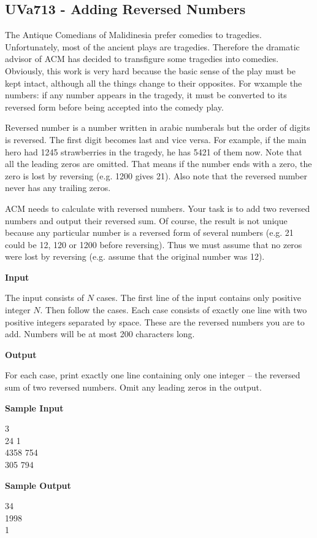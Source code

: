 \subsection{UVa713 - Adding Reversed Numbers}
The Antique Comedians of Malidinesia prefer comedies to tragedies. Unfortunately, most of the ancient plays are tragedies. Therefore the dramatic advisor of ACM has decided to transfigure some tragedies into comedies. Obviously, this work is very hard because the basic sense of the play must be kept intact, although all the things change to their opposites. For wxample the numbers: if any number appears in the tragedy, it must be converted to its reversed form before being accepted into the comedy play.

Reversed number is a number written in arabic numberals but the order of digits is reversed. The first digit becomes last and vice versa. For example, if the main hero had 1245 strawberries in the tragedy, he has 5421 of them now. Note that all the leading zeros are omitted. That means if the number ends with a zero, the zero is lost by reversing (e.g. 1200 gives 21). Also note that the reversed number never has any trailing zeros.

ACM needs to calculate with reversed numbers. Your task is to add two reversed numbers and output their reversed sum. Of course, the result is not unique because any particular number is a reversed form of several numbers (e.g. 21 could be 12, 120 or 1200 before reversing). Thus we must assume that no zeros were lost by reversing (e.g. assume that the original number was 12).

\begin{flushleft}
{\color{red} \textbf{Input}}
\end{flushleft}
The input consists of $N$ cases. The first line of the input contains only positive integer $N$. Then follow the cases. Each case consists of exactly one line with two positive integers separated by space. These are the reversed numbers you are to add. Numbers will be at most 200 characters long.

\begin{flushleft}
{\color{red} \textbf{Output}}
\end{flushleft}
For each case, print exactly one line containing only one integer -- the reversed sum of two reversed numbers. Omit any leading zeros in the output.

\begin{flushleft}
{\color{red} \textbf{Sample Input}}
\end{flushleft}
\begin{flushleft}
3\\
24 1\\
4358 754\\
305 794\\
\end{flushleft}

\begin{flushleft}
{\color{red} \textbf{Sample Output}}
\end{flushleft}
\begin{flushleft}
34\\
1998\\
1\\
\end{flushleft}

\newpage